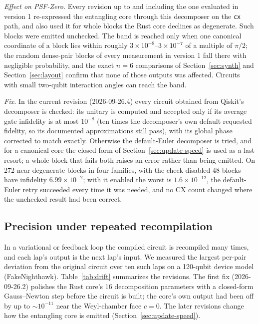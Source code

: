 \documentclass[11pt]{article}
\begin{document}
\emph{Effect on PSF-Zero.} Every revision up to and including the one
evaluated in version 1 re-expressed the entangling core through this
decomposer on the \texttt{cx} path, and also used it for whole blocks the
Rust core declines as degenerate. Such blocks were emitted unchecked. The
band is reached only when one canonical coordinate of a block lies within
roughly $3\times10^{-8}$--$3\times10^{-7}$ of a multiple of $\pi/2$; the
random dense-pair blocks of every measurement in version 1 fall there
with negligible probability, and the exact $n=6$ comparisons of
Section~\ref{sec:synth} and Section~\ref{sec:layout} confirm that none of
those outputs was affected. Circuits with small two-qubit interaction
angles can reach the band.

\emph{Fix.} In the current revision (2026-09-26.4) every circuit
obtained from Qiskit's decomposer is checked: its unitary is computed and
accepted only if its average gate infidelity is at most $10^{-8}$ (ten
times the decomposer's own default requested fidelity, so its documented
approximations still pass), with its global phase corrected to match
exactly. Otherwise the default-Euler decomposer is tried, and for a
canonical core the closed form of Section~\ref{sec:update-speed} is used
as a last resort; a whole block that fails both raises an error rather
than being emitted. On 272 near-degenerate blocks in four families, with
the check disabled 48 blocks have infidelity $6.99\times10^{-2}$; with
it enabled the worst is $1.6\times10^{-12}$, the default-Euler retry
succeeded every time it was needed, and no CX count changed where the
unchecked result had been correct.

\subsection{Precision under repeated recompilation}

In a variational or feedback loop the compiled circuit is recompiled many
times, and each lap's output is the next lap's input. We measured the
largest per-pair deviation from the original circuit over ten such laps
on a 120-qubit device model (FakeNighthawk). Table~\ref{tab:drift}
summarizes the revisions. The first fix (2026-09-26.2) polishes the Rust
core's 16 decomposition parameters with a closed-form Gauss--Newton step
before the circuit is built; the core's own output had been off by up to
$\sim\!10^{-11}$ near the Weyl-chamber face $c=0$. The later revisions
change how the entangling core is emitted
(Section~\ref{sec:update-speed}).
\end{document}
